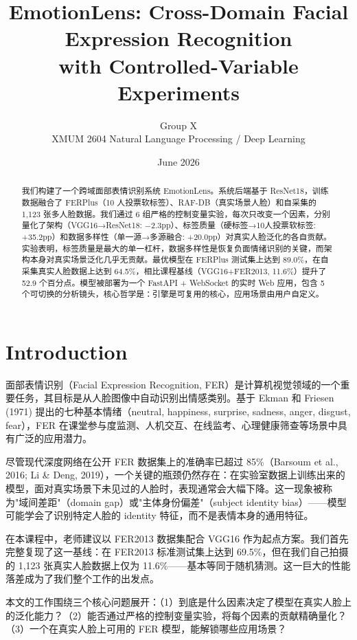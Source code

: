 \documentclass[12pt,a4paper]{article}
\title{\textbf{EmotionLens: Cross-Domain Facial Expression Recognition\\
with Controlled-Variable Experiments}}
\author{Group X \\ XMUM 2604 Natural Language Processing / Deep Learning}
\date{June 2026}
\begin{document}
\maketitle

\begin{abstract}
我们构建了一个跨域面部表情识别系统 EmotionLens。系统后端基于 ResNet18，训练数据融合了 FERPlus（10 人投票软标签）、RAF-DB（真实场景人脸）和自采集的 1,123 张多人脸数据。我们通过 6 组严格的控制变量实验，每次只改变一个因素，分别量化了架构（VGG16→ResNet18: −2.3pp）、标签质量（硬标签→10人投票软标签: +35.2pp）和数据多样性（单一源→多源融合: +20.0pp）对真实人脸泛化的各自贡献。实验表明，标签质量是最大的单一杠杆，数据多样性是恢复负面情绪识别的关键，而架构本身对真实场景泛化几乎无贡献。最优模型在 FERPlus 测试集上达到 89.0\%，在自采集真实人脸数据上达到 64.5\%，相比课程基线（VGG16+FER2013, 11.6\%）提升了 52.9 个百分点。模型被部署为一个 FastAPI + WebSocket 的实时 Web 应用，包含 5 个可切换的分析镜头，核心哲学是：引擎是可复用的核心，应用场景由用户自定义。
\end{abstract}

\tableofcontents
\newpage

\section{Introduction}

面部表情识别（Facial Expression Recognition, FER）是计算机视觉领域的一个重要任务，其目标是从人脸图像中自动识别出情感类别。基于 Ekman 和 Friesen (1971) 提出的七种基本情绪（neutral, happiness, surprise, sadness, anger, disgust, fear），FER 在课堂参与度监测、人机交互、在线监考、心理健康筛查等场景中具有广泛的应用潜力。

尽管现代深度网络在公开 FER 数据集上的准确率已超过 85\%（Barsoum et al., 2016; Li \& Deng, 2019），一个关键的瓶颈仍然存在：在实验室数据上训练出来的模型，面对真实场景下未见过的人脸时，表现通常会大幅下降。这一现象被称为"域间差距"（domain gap）或"主体身份偏差"（subject identity bias）——模型可能学会了识别特定人脸的 identity 特征，而不是表情本身的通用特征。

在本课程中，老师建议以 FER2013 数据集配合 VGG16 作为起点方案。我们首先完整复现了这一基线：在 FER2013 标准测试集上达到 69.5\%，但在我们自己拍摄的 1,123 张真实人脸数据上仅为 11.6\%——基本等同于随机猜测。这一巨大的性能落差成为了我们整个工作的出发点。

本文的工作围绕三个核心问题展开：（1）到底是什么因素决定了模型在真实人脸上的泛化能力？（2）能否通过严格的控制变量实验，将每个因素的贡献精确量化？（3）一个在真实人脸上可用的 FER 模型，能解锁哪些应用场景？
\end{document}

